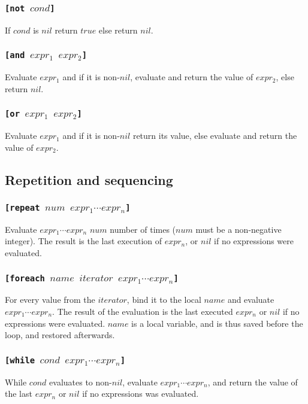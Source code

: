 \subsubsection{\tt{[not }$cond$\tt{]}}
If $cond$ is $nil$ return $true$ else return $nil$.

\subsubsection{\tt{[and }$expr_1$ $expr_2$\tt{]}}
Evaluate $expr_1$ and if it is non-$nil$, evaluate and return the value of $expr_2$, else return $nil$.

\subsubsection{\tt{[or }$expr_1$ $expr_2$\tt{]}}
Evaluate $expr_1$ and if it is non-$nil$ return its value, else evaluate and return the value of $expr_2$.

\subsection{Repetition and sequencing}
\subsubsection{\tt{[repeat }$num$ $expr_1 \cdots expr_n$\tt{]}}
Evaluate $expr_1 \cdots expr_n$ $num$ number of times ($num$ must be a non-negative integer). The result is the last execution of $expr_n$, or $nil$ if no expressions were evaluated.

\subsubsection{\tt{[foreach }$name$ $iterator$ $expr_1 \cdots expr_n$\tt{]}}
For every value from the $iterator$, bind it to the local $name$ and evaluate $expr_1 \cdots expr_n$. The result of the evaluation is the last executed $expr_n$ or $nil$ if no expressions were evaluated. $name$ is a local variable, and is thus saved before the loop, and restored afterwards.

\subsubsection{\tt{[while }$cond$ $expr_1 \cdots expr_n$\tt{]}}
While $cond$ evaluates to non-$nil$, evaluate $expr_1 \cdots expr_n$, and return the value of the last $expr_n$ or $nil$ if no expressions was evaluated.


